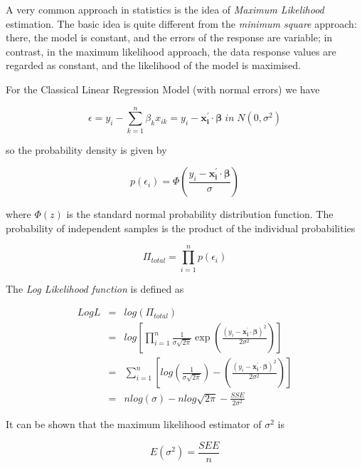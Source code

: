 A very common approach in statistics is the idea of \emph{Maximum Likelihood} estimation.  The basic idea is quite different from the \emph{minimum square} approach: there, the model is constant, and the errors of the response are variable; in contrast, in the maximum likelihood approach, the data response values are regarded as constant, and the likelihood of the model is maximised.

For the Classical Linear Regression Model (with normal errors) we have

\begin{equation}
  \epsilon = y_i - \sum_{k=1}^n \beta_k x_{ik} = y_i - \mathbf{x_i^{'}} \cdot \boldsymbol\beta \; in \; N(0, \sigma^2)
\end{equation}

so the probability density is given by

\begin{equation}
  p(\epsilon_i) =  \Phi (\frac{y_i - \mathbf{x_i^{'}} \cdot \boldsymbol\beta}{\sigma})
\end{equation}

where $\Phi(z)$ is the standard normal probability distribution function. The probability of independent samples is the product of the individual probabilities

\begin{equation}
  \Pi_{total} = \prod_{i=1}^n p(\epsilon_i)
\end{equation}

The \emph{Log Likelihood function}  is defined as

\begin{eqnarray*}
  Log L &=& log(\Pi_{total}) \\
  &=& log\left[\prod_{i=1}^n \frac{1}{\sigma\sqrt{2 \pi}} \exp \left(\frac{(y_i - \mathbf{x_i^{'}} \cdot \boldsymbol\beta)^2}{2 \sigma^2}\right)\right] \\
  &=& \sum_{i=1}^n\left[log\left(\frac{1}{\sigma \sqrt{2 \pi}}\right)- \left(\frac{(y_i - \mathbf{x_i^{'}} \cdot \boldsymbol\beta)^2}{2 \sigma^2}\right)\right] \\
 &=& n log(\sigma) - n log \sqrt{2 \pi} - \frac{SSE}{2 \sigma^2}
\end{eqnarray*}

It can be shown that the maximum likelihood estimator of $\sigma^2$ is

\begin{equation}
  E(\sigma^2) = \frac{SEE}{n}
\end{equation}

